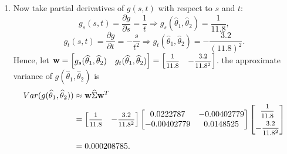\begin{solution}
    \begin{enumerate}
        \item Now take partial derivatives of $g(s,t)$ with respect to $s$ and $t$:
        \[
            g_s(s,t) = \frac{\partial g}{\partial s} = \frac{1}{t} \Longrightarrow g_s(\widehat{\theta}_1, \widehat{\theta}_2) = \frac{1}{11.8},
        \]
        \[
            g_t(s,t) = \frac{\partial g}{\partial t} = -\frac{s}{t^2} \Longrightarrow g_t(\widehat{\theta}_1, \widehat{\theta}_2) = -\frac{3.2}{(11.8)^2}.
        \]
        Hence, 
        let $\mathbf{w} = \begin{bmatrix}
            g_s(\widehat{\theta}_1, \widehat{\theta}_2) &
            g_t(\widehat{\theta}_1, \widehat{\theta}_2)
        \end{bmatrix} = \begin{bmatrix}
            \mfrac{1}{11.8} &
            -\mfrac{3.2}{11.8^2}
        \end{bmatrix}$.
        the approximate variance of $g(\widehat{\theta}_1, \widehat{\theta}_2)$ is
        \begin{align*}
            Var(g(\widehat{\theta}_1, \widehat{\theta}_2)) &\approx \mathbf{w} \widehat{\Sigma} \mathbf{w}^T \\
            &= \begin{bmatrix}
                \mfrac{1}{11.8} &
                -\mfrac{3.2}{11.8^2}
            \end{bmatrix}
            \begin{bmatrix}
                0.0222787 & -0.00402779 \\
                -0.00402779 & 0.0148525
            \end{bmatrix}
            \begin{bmatrix}
                \mfrac{1}{11.8} \\[0.6em]
                -\mfrac{3.2}{11.8^2}
            \end{bmatrix}\\[0.6em]
            &= 0.000208785.
        \end{align*}


\end{enumerate}
\end{solution}
